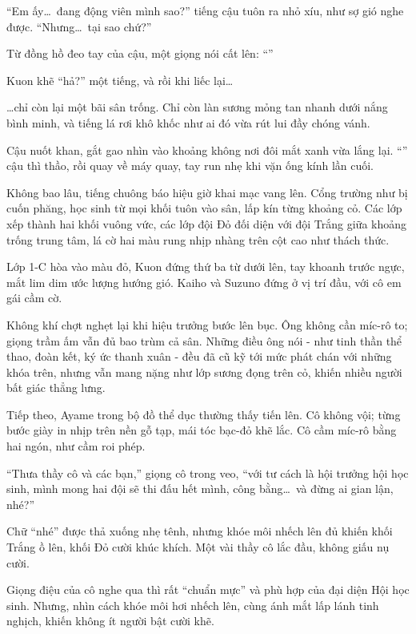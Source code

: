 \documentclass[../main.tex]{subfiles}
\begin{document}
``Em ấy\dots\ đang động viên mình sao?'' tiếng cậu tuôn ra nhỏ xíu, như sợ gió nghe được. ``Nhưng\dots\ tại sao chứ?''

Từ đồng hồ đeo tay của cậu, một giọng nói cất lên: ``''

Kuon khẽ ``hả?'' một tiếng, và rồi khi liếc lại\dots

\dots chỉ còn lại một bãi sân trống. Chỉ còn làn sương mỏng tan nhanh dưới nắng bình minh, và tiếng lá rơi khô khốc như ai đó vừa rút lui đầy chóng vánh.

Cậu nuốt khan, gắt gao nhìn vào khoảng không nơi đôi mắt xanh vừa lắng lại. ``'' cậu thì thầo, rồi quay về máy quay, tay run nhẹ khi vặn ống kính lần cuối.

\ct

Không bao lâu, tiếng chuông báo hiệu giờ khai mạc vang lên. Cổng trường như bị cuốn phăng, học sinh từ mọi khối tuôn vào sân, lấp kín từng khoảng cỏ. Các lớp xếp thành hai khối vuông vức, các lớp đội Đỏ đối diện với đội Trắng giữa khoảng trống trung tâm, lá cờ hai màu rung nhịp nhàng trên cột cao như thách thức.

Lớp 1-C hòa vào màu đỏ, Kuon đứng thứ ba từ dưới lên, tay khoanh trước ngực, mắt lim dim ước lượng hướng gió. Kaiho và Suzuno đứng ở vị trí đầu, với cô em gái cầm cờ.

Không khí chợt nghẹt lại khi hiệu trưởng bước lên bục. Ông không cần míc-rô to; giọng trầm ấm vẫn đủ bao trùm cả sân. Những điều ông nói - như tinh thần thể thao, đoàn kết, ký ức thanh xuân - đều đã cũ kỹ tới mức phát chán với những khóa trên, nhưng vẫn mang nặng như lớp sương đọng trên cỏ, khiến nhiều người bất giác thẳng lưng.

Tiếp theo, Ayame trong bộ đồ thể dục thường thấy tiến lên. Cô không vội; từng bước giày in nhịp trên nền gỗ tạp, mái tóc bạc-đỏ khẽ lắc. Cô cầm míc-rô bằng hai ngón, như cầm roi phép.

``Thưa thầy cô và các bạn,'' giọng cô trong veo, ``với tư cách là hội trưởng hội học sinh, mình mong hai đội sẽ thi đấu hết mình, công bằng\dots\ và đừng ai gian lận, nhé?''

Chữ ``nhé'' được thả xuống nhẹ tênh, nhưng khóe môi nhếch lên đủ khiến khối Trắng ồ lên, khối Đỏ cười khúc khích. Một vài thầy cô lắc đầu, không giấu nụ cười.

Giọng điệu của cô nghe qua thì rất ``chuẩn mực'' và phù hợp của đại diện Hội học sinh. Nhưng, nhìn cách khóe môi hơi nhếch lên, cùng ánh mắt lấp lánh tinh nghịch, khiến không ít người bật cười khẽ.
\end{document}
